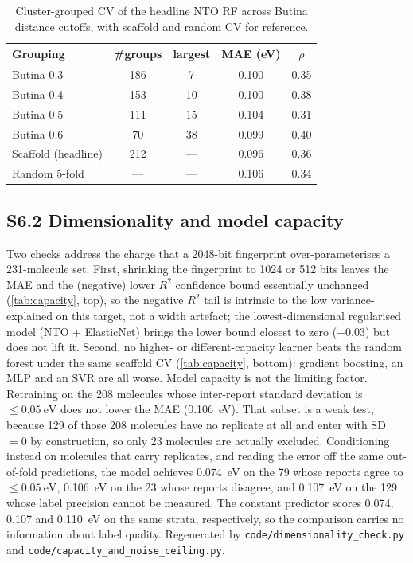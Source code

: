 \documentclass[final,3p,times,twocolumn]{elsarticle}
\begin{document}
\begin{table}[htbp]
  \centering
  \caption{Cluster-grouped CV of the headline NTO RF across Butina distance cutoffs,
    with scaffold and random CV for reference.}
  \label{tab:clustercv}
  \footnotesize
  \begin{tabular}{lcccc}
    \toprule
    Grouping & \#groups & largest & MAE (eV) & $\rho$ \\
    \midrule
    Butina 0.3 & 186 & 7  & 0.100 & 0.35 \\
    Butina 0.4 & 153 & 10 & 0.100 & 0.38 \\
    Butina 0.5 & 111 & 15 & 0.104 & 0.31 \\
    Butina 0.6 & 70  & 38 & 0.099 & 0.40 \\
    \midrule
    Scaffold (headline) & 212 & --- & 0.096 & 0.36 \\
    Random 5-fold       & --- & --- & 0.106 & 0.34 \\
    \bottomrule
  \end{tabular}
\end{table}

\subsection*{S6.2 Dimensionality and model capacity}
Two checks address the charge that a \num{2048}-bit fingerprint over-parameterises a
\num{231}-molecule set. First, shrinking the fingerprint to \num{1024} or \num{512} bits
leaves the MAE and the (negative) lower $R^2$ confidence bound essentially unchanged
(\cref{tab:capacity}, top), so the negative $R^2$ tail is intrinsic to the low
variance-explained on this target, not a width artefact; the lowest-dimensional regularised
model (NTO + ElasticNet) brings the lower bound closest to zero ($-0.03$) but does not lift
it. Second, no higher- or different-capacity learner beats the random forest under the same
scaffold CV (\cref{tab:capacity}, bottom): gradient boosting, an MLP and an SVR are all
worse. Model capacity is not the limiting factor. Retraining on the \num{208} molecules whose
inter-report standard deviation is $\le\qty{0.05}{\electronvolt}$ does not lower the MAE
(\qty{0.106}{\electronvolt}). That subset is a weak test, because \num{129} of those
\num{208} molecules have no replicate at all and enter with SD~$=0$ by construction, so
only \num{23} molecules are actually excluded. Conditioning instead on molecules that
carry replicates, and reading the error off the same out-of-fold predictions, the model
achieves \qty{0.074}{\electronvolt} on the \num{79} whose reports agree to
$\le\qty{0.05}{\electronvolt}$, \qty{0.106}{\electronvolt} on the \num{23} whose
reports disagree, and \qty{0.107}{\electronvolt} on the \num{129} whose label precision
cannot be measured. The constant predictor scores \qty{0.074}{}, \qty{0.107}{} and
\qty{0.110}{\electronvolt} on the same strata, respectively, so the comparison carries
no information about label quality. Regenerated by \texttt{code/dimensionality\_check.py} and
\texttt{code/capacity\_and\_noise\_ceiling.py}.
\end{document}
